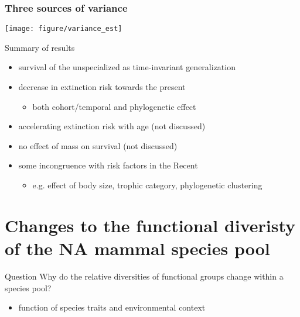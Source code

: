 \documentclass{beamer}
\begin{document}
\begin{frame}
  \frametitle{Three sources of variance}

  \begin{center}
    \texttt{[image: figure/variance\_est]}
  \end{center}

  \tiny{}
\end{frame}

\begin{frame}
  \begin{block}{Summary of results}
    \begin{itemize}
      \item survival of the unspecialized as time-invariant generalization
      \item decrease in extinction risk towards the present
        \begin{itemize}
          \item both cohort/temporal and phylogenetic effect
        \end{itemize}
      \item accelerating extinction risk with age (not discussed)
      \item no effect of mass on survival (not discussed)
      \item some incongruence with risk factors in the Recent
        \begin{itemize}
          \item e.g. effect of body size, trophic category, phylogenetic clustering
        \end{itemize}
    \end{itemize}
  \end{block}
\end{frame}



\section{Changes to the functional diveristy of the NA mammal species pool}

\begin{frame}
  \begin{alertblock}{Question}
    \alert{Why} do the relative diversities of functional groups change within a species pool?
    \begin{itemize}
      \item function of \alert{species traits} and \alert{environmental context}
    \end{itemize}
  \end{alertblock}
\end{frame}
\end{document}
